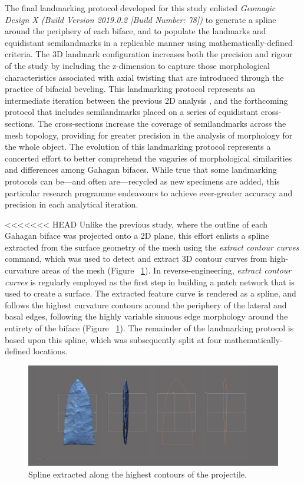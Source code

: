 \documentclass[review]{elsarticle}
\begin{document}
The final landmarking protocol developed for this study \citep{RN20850} enlisted \textit{Geomagic Design X (Build Version 2019.0.2 [Build Number: 78])} to generate a spline around the periphery of each biface, and to populate the landmarks and equidistant semilandmarks in a replicable manner using mathematically-defined criteria. The 3D landmark configuration increases both the precision and rigour of the study by including the z-dimension to capture those morphological characteristics associated with axial twisting that are introduced through the practice of bifacial beveling. This landmarking protocol represents an intermediate iteration between the previous 2D analysis \citep{RN11783}, and the forthcoming protocol that includes semilandmarks placed on a series of equidistant cross-sections. The cross-sections increase the coverage of semilandmarks across the mesh topology, providing for greater precision in the analysis of morphology for the whole object. The evolution of this landmarking protocol represents a concerted effort to better comprehend the vagaries of morphological similarities and differences among Gahagan bifaces. While true that some landmarking protocols can be—and often are—recycled as new specimens are added, this particular research programme endeavours to achieve ever-greater accuracy and precision in each analytical iteration.

<<<<<<< HEAD
Unlike the previous study, where the outline of each Gahagan biface was projected onto a 2D plane, this effort enlists a spline extracted from the surface geometry of the mesh using the \textit{extract contour curves} command, which was used to detect and extract 3D contour curves from high-curvature areas of the mesh (Figure ~\ref{fig:fig-extractspline}). In reverse-engineering, \textit{extract contour curves} is regularly employed as the first step in building a patch network that is used to create a surface. The extracted feature curve is rendered as a spline, and follows the highest curvature contours around the periphery of the lateral and basal edges, following the highly variable sinuous edge morphology around the entirety of the biface (Figure ~\ref{fig:fig-extractspline}). The remainder of the landmarking protocol is based upon this spline, which was subsequently split at four mathematically-defined locations.

\begin{figure}[ht]\centering
\includegraphics[width=\linewidth]{analysis/images/extractspline.pdf}
\caption{Spline extracted along the highest contours of the projectile.}
\label{fig:fig-extractspline}
\end{figure}
\end{document}
